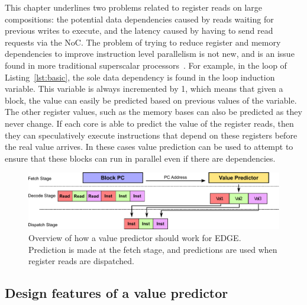 
This chapter underlines two problems related to register reads on large compositions: the potential data dependencies caused by reads waiting for previous writes to execute, and the latency caused by having to send read requests via the NoC.
The problem of trying to reduce register and memory dependencies to improve instruction level parallelism is not new, and is an issue found in more traditional superscalar processors~\cite{peraisVTAGE2014}.
For example, in the loop of Listing~\ref{lst:basic}, the sole data dependency is found in the loop induction variable.
This variable is always incremented by 1, which means that given a block, the value can easily be predicted based on previous values of the variable.
The other register values, such as the memory bases can also be predicted as they never change.
If each core is able to predict the value of the register reads, then they can speculatively execute instructions that depend on these registers before the real value arrives.
In these cases value prediction can be used to attempt to ensure that these blocks can run in parallel even if there are dependencies.

\begin{figure}[t]
    \centering
    \includegraphics[width=1\textwidth]{chapter3/graphics/val_pred_overview.pdf}
    \caption{Overview of how a value predictor should work for EDGE. Prediction is made at the fetch stage, and predictions are used when register reads are dispatched.}
    \label{fig:bad_overview}
\vspace{1em}
\end{figure}

\subsection{Design features of a value predictor}

